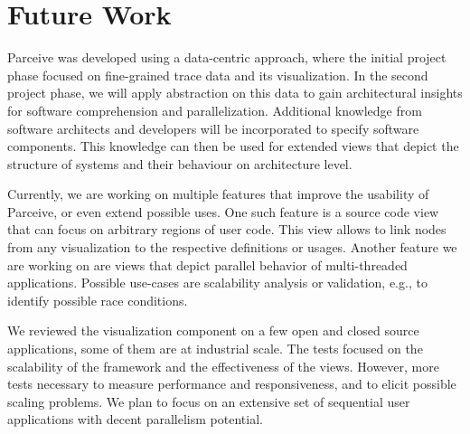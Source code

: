 \section{Future Work}
\label{sec:future_work}
Parceive was developed using a data-centric approach, where the initial project
phase focused on fine-grained trace data and its visualization. In the second
project phase, we will apply abstraction on this data to gain architectural
insights for software comprehension and parallelization. Additional knowledge
from software architects and developers will be incorporated to specify
software components. This knowledge can then be used for extended views that
depict the structure of systems and their behaviour on architecture level.

Currently, we are working on multiple features that improve the usability of
Parceive, or even extend possible uses. One such feature is a source code view
that can focus on arbitrary regions of user code. This view allows to link
nodes from any visualization to the respective definitions or usages. Another
feature we are working on are views that depict parallel behavior of
multi-threaded applications. Possible use-cases are scalability analysis or
validation, e.g., to identify possible race conditions.

We reviewed the visualization component on a few open and closed source
applications, some of them are at industrial scale. The tests focused on the
scalability of the framework and the effectiveness of the views. However, more
tests necessary to measure performance and responsiveness, and to elicit
possible scaling problems. We plan to focus on an extensive set of sequential
user applications with decent parallelism potential.